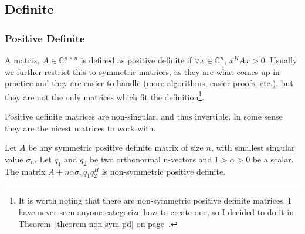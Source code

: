 \subsection{Definite}

\subsubsection{Positive Definite}

A matrix, $A\in\mathbb{C}^{n\times n}$ is defined as positive definite if $\forall x\in\mathbb{C}^n$, $x^HAx>0$.  Usually we further restrict this to symmetric matrices, as they are what comes up in practice and they are easier to handle (more algorithms, easier proofs, etc.), but they are not the only matrices which fit the definition\footnote{It is worth noting that there are non-symmetric positive definite matrices.  I have never seen anyone categorize how to create one, so I decided to do it in Theorem~\ref{theorem-non-sym-pd} on page~\pageref{theorem-non-sym-pd}.}.

Positive definite matrices are non-singular, and thus invertible.  In some sense they are the nicest matrices to work with.


\begin{theorem}\label{theorem-non-sym-pd}
Let $A$ be any symmetric positive definite matrix of size $n$, with smallest singular value $\sigma_n$.  Let $q_1$ and $q_2$ be two orthonormal n-vectors and $1>\alpha>0$ be a scalar. The matrix $A+n\alpha\sigma_n q_1q_2^H$ is non-symmetric positive definite.
\end{theorem}

